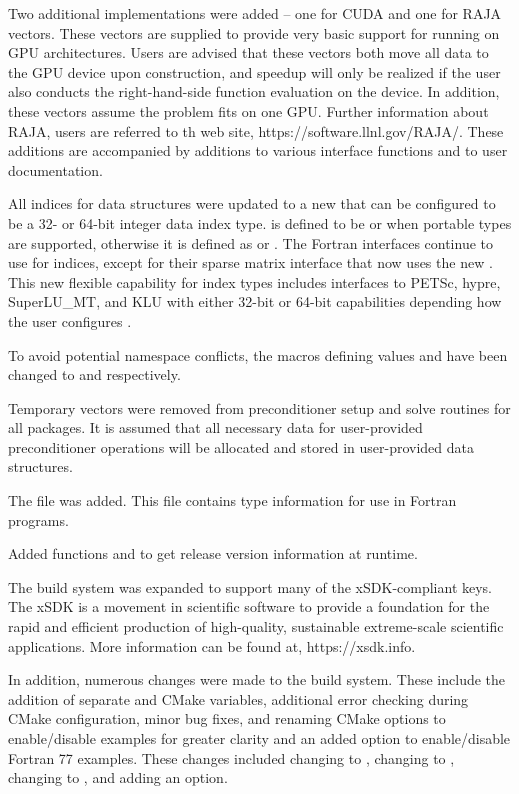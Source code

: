 Two additional {\nvector} implementations were added -- one for
CUDA and one for RAJA vectors.  
These vectors are supplied to provide very basic support for running
on GPU architectures.  Users are advised that these vectors both move all data
to the GPU device upon construction, and speedup will only be realized if the
user also conducts the right-hand-side function evaluation on the device.
In addition, these vectors assume the problem fits on one GPU.
Further information about RAJA, users are referred to th web site, 
https://software.llnl.gov/RAJA/.
These additions are accompanied by additions to various interface functions
and to user documentation.

All indices for data structures were updated to a new  that
can be configured to be a 32- or 64-bit integer data index type. 
 is defined to be  or  when portable types are
supported, otherwise it is defined as  or .
The Fortran interfaces continue to use  for indices, except for 
their sparse matrix interface that now uses the new .
This new flexible capability for index types includes interfaces to 
PETSc, hypre, SuperLU\_MT, and KLU with 
either 32-bit or 64-bit capabilities depending how the user configures 
{\sundials}.

To avoid potential namespace conflicts, the macros defining 
values  and  have been changed to  and
 respectively.

Temporary vectors were removed from preconditioner setup and solve
routines for all packages.  It is assumed that all necessary data
for user-provided preconditioner operations will be allocated and
stored in user-provided data structures.

The file  was added. This file contains 
{\sundials} type information for use in Fortran programs.

Added functions  and  to
get {\sundials} release version information at runtime.

The build system was expanded to support many of the xSDK-compliant keys. 
The xSDK is a movement in scientific software to provide a foundation for the
rapid and efficient production of high-quality, 
sustainable extreme-scale scientific applications.  More information can
be found at, https://xsdk.info.

In addition, numerous changes were made to the build system.
These include the addition of separate  and  
CMake variables, additional error checking during CMake configuration,
minor bug fixes, and renaming CMake options to enable/disable examples 
for greater clarity and an added option to enable/disable Fortran 77 examples.
These changes included changing  to , 
changing  to , changing  to 
, and adding an  option.

